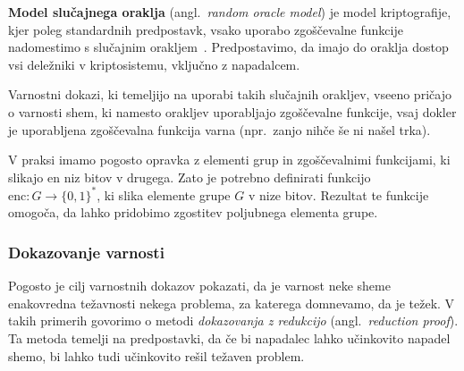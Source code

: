 \textbf{Model slučajnega oraklja} (angl.\ \textit{random oracle model}) je model kriptografije, kjer poleg 
standardnih predpostavk, vsako uporabo zgoščevalne funkcije nadomestimo s slučajnim
orakljem~\cite{boneh2023appcry}. Predpostavimo, da imajo do oraklja dostop vsi deležniki v kriptosistemu,
vključno z napadalcem.

Varnostni dokazi, ki temeljijo na uporabi takih slučajnih orakljev, vseeno pričajo o varnosti shem,
ki namesto orakljev uporabljajo zgoščevalne funkcije, vsaj dokler je uporabljena zgoščevalna funkcija
varna (npr.\ zanjo nihče še ni našel trka).

\begin{opomba}
    V praksi imamo pogosto opravka z elementi grup in zgoščevalnimi funkcijami, ki slikajo en niz bitov
    v drugega. Zato je potrebno definirati funkcijo $\text{enc}: G \rightarrow \{0, 1\}^*$, ki slika
    elemente grupe $G$ v nize bitov. Rezultat te funkcije omogoča, da lahko pridobimo zgostitev
    poljubnega elementa grupe.
\end{opomba}

\subsubsection{Dokazovanje varnosti}
\label{sec:proofs}
Pogosto je cilj varnostnih dokazov pokazati, da je varnost neke sheme enakovredna težavnosti nekega
problema, za katerega domnevamo, da je težek. V takih primerih govorimo o metodi
\textit{dokazovanja z redukcijo} (angl.\ \textit{reduction proof}). Ta metoda temelji na predpostavki,
da če bi napadalec lahko učinkovito napadel shemo, bi lahko tudi učinkovito rešil težaven problem.

